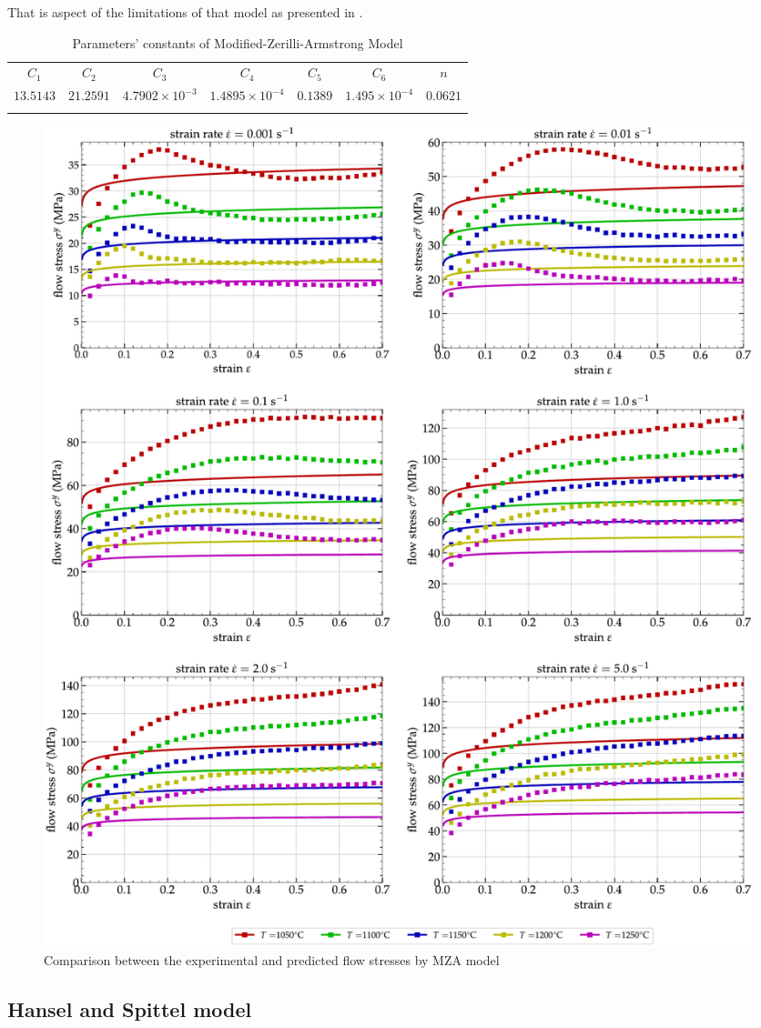 \documentclass[twoside,english,1p,final,sort&compress]{elsarticle}
\theoremstyle{plain}
\begin{document}
That is aspect of the limitations of that model as presented in \cite{TizeMha-2022}.
\begin{table}[h!]
\centering{}
\caption{Parameters' constants of Modified-Zerilli-Armstrong Model}
\begin{tabular}{ccccccc}
\hline
$C_1$ & $C_2$ & $C_3$ & $C_4$ & $C_5$ & $C_6$ & $n$\\
$13.5143$ & $21.2591$ & $4.7902\times 10^{-3}$ & $1.4895\times 10^{-4}$ & $0.1389$ & $1.495\times 10^{-4}$ & $0.0621$\\
\hline
\label{tab: MZAparameters}
\end{tabular}
\end{table}
\begin{figure}[!ht]
\centering
\includegraphics[width=1.02\columnwidth]
{Figures/CompExp-MZA-6}
\caption{Comparison between the experimental and predicted flow stresses by MZA model}
\label{fig:iCorrelationMZA}
\end{figure}
\FloatBarrier

\subsection{Hansel and Spittel model\label{sec:HSmodel}}
\end{document}
